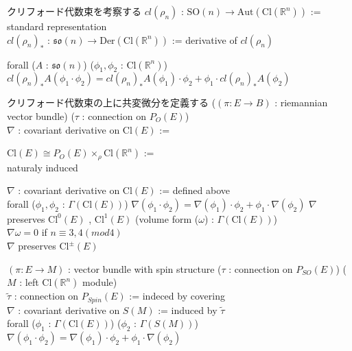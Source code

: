 \begin{Definition}
\itemnote
  クリフォード代数束を考察する
\itemdefi
  \Define \(cl(\rho_n)\) : \(\text{SO}(n) \to \text{Aut}(\text{Cl}(\mathbb{R}^n))\) := standard representation \\
  \Define \(cl(\rho_n)_*\) : \(\mathfrak{so}(n) \to \text{Der}(\text{Cl}(\mathbb{R}^n))\) := derivative of \(cl(\rho_n)\)
\end{Definition}

\begin{Theorem}
\itemprop
  forall (\(A\) : \(\mathfrak{so}(n)\)) (\(\phi_1 , \phi_2\) : \(\text{Cl}(\mathbb{R}^n)\)) \\
  \({cl(\rho_n)_* A}(\phi_1 \cdot \phi_2) = {cl(\rho_n)_* A}(\phi_1) \cdot \phi_2 + \phi_1 \cdot {cl(\rho_n)_* A}(\phi_2)\)
\end{Theorem}

\begin{Definition}
\itemnote
  クリフォード代数束の上に共変微分を定義する
\itemdefi
  \For (\((\pi : E \to B)\) : riemannian vector bundle)  (\(\tau\) : connection on \(P_{O}(E)\)) \\
  \Define \(\nabla\) : covariant derivative on \(\text{Cl}(E)\) :=
  \begin{indentblock}
    \Let \(\text{Cl}(E) \cong P_{O}(E) \times_{\rho} \text{Cl}(\mathbb{R}^n)\) :=  \\
    \Then naturaly induced
  \end{indentblock}
\end{Definition}

\begin{Theorem}
\itemprop
  \Let \(\nabla\) : covariant derivative on \(\text{Cl}(E)\) := defined above \\
  \Then forall (\(\phi_1 , \phi_2\) : \(\Gamma(\text{Cl}(E))\)) \(\nabla(\phi_1 \cdot \phi_2) = \nabla(\phi_1) \cdot \phi_2 + \phi_1 \cdot \nabla(\phi_2)\)
\itemprop
  \(\nabla\) preserves \(\text{Cl}^0(E)\) , \(\text{Cl}^1(E)\)
\itemprop
  \For (volume form (\(\omega\)) : \(\Gamma(\text{Cl}(E))\)) \\
  \(\nabla \omega = 0\)
\itemprop
  if \(n \equiv 3 , 4(mod 4)\) \\
  \(\nabla\) preserves \(\text{Cl}^{\pm}(E)\)
\end{Theorem}

\begin{Definition}
\itemwhen
  \Fix \((\pi : E \to M)\) : vector bundle with spin structure
\itemdefi
  \For (\(\tau\) : connection on \(P_{SO}(E)\)) (\(M\) : left \(\text{Cl}(\mathbb{R}^n)\) module) \\
  \Let \(\tilde{\tau}\) : connection on \(P_{Spin}(E)\) := indeced by covering \\
  \Let \(\nabla\) : covariant derivative on \(S(M)\) := induced by \(\tilde{\tau}\)\\
  \Then forall (\(\phi_1\) : \(\Gamma(\text{Cl}(E))\)) (\(\phi_2\) : \(\Gamma(S(M))\)) \(\nabla(\phi_1 \cdot \phi_2) = \nabla(\phi_1) \cdot \phi_2 + \phi_1 \cdot \nabla(\phi_2)\)
\end{Definition}

